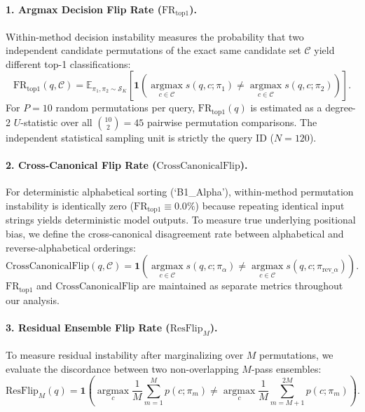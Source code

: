 \documentclass[11pt,a4paper]{article}
\begin{document}
\paragraph{1. Argmax Decision Flip Rate ($\mathrm{FR}_{\mathrm{top1}}$).}
Within-method decision instability measures the probability that two independent candidate permutations of the exact same candidate set $\mathcal{C}$ yield different top-1 classifications:
\begin{equation}
\mathrm{FR}_{\mathrm{top1}}(q, \mathcal{C}) = \mathbb{E}_{\pi_1, \pi_2 \sim \mathcal{S}_K} \left[ \mathbf{1}\left( \operatorname*{argmax}_{c \in \mathcal{C}} s(q, c; \pi_1) \neq \operatorname*{argmax}_{c \in \mathcal{C}} s(q, c; \pi_2) \right) \right].
\end{equation}
For $P=10$ random permutations per query, $\mathrm{FR}_{\mathrm{top1}}(q)$ is estimated as a degree-2 $U$-statistic over all $\binom{10}{2} = 45$ pairwise permutation comparisons. The independent statistical sampling unit is strictly the query ID ($N=120$).

\paragraph{2. Cross-Canonical Flip Rate ($\mathrm{CrossCanonicalFlip}$).}
For deterministic alphabetical sorting (`B1\_Alpha'), within-method permutation instability is identically zero ($\mathrm{FR}_{\mathrm{top1}} \equiv 0.0\%$) because repeating identical input strings yields deterministic model outputs. To measure true underlying positional bias, we define the cross-canonical disagreement rate between alphabetical and reverse-alphabetical orderings:
\begin{equation}
\mathrm{CrossCanonicalFlip}(q, \mathcal{C}) = \mathbf{1}\left( \operatorname*{argmax}_{c \in \mathcal{C}} s(q, c; \pi_{\alpha}) \neq \operatorname*{argmax}_{c \in \mathcal{C}} s(q, c; \pi_{\mathrm{rev\_}\alpha}) \right).
\end{equation}
$\mathrm{FR}_{\mathrm{top1}}$ and $\mathrm{CrossCanonicalFlip}$ are maintained as separate metrics throughout our analysis.

\paragraph{3. Residual Ensemble Flip Rate ($\mathrm{ResFlip}_M$).}
To measure residual instability after marginalizing over $M$ permutations, we evaluate the discordance between two non-overlapping $M$-pass ensembles:
\begin{equation}
\mathrm{ResFlip}_M(q) = \mathbf{1}\left( \operatorname*{argmax}_{c} \frac{1}{M}\sum_{m=1}^M p(c; \pi_m) \neq \operatorname*{argmax}_{c} \frac{1}{M}\sum_{m=M+1}^{2M} p(c; \pi_m) \right).
\end{equation}
\end{document}
